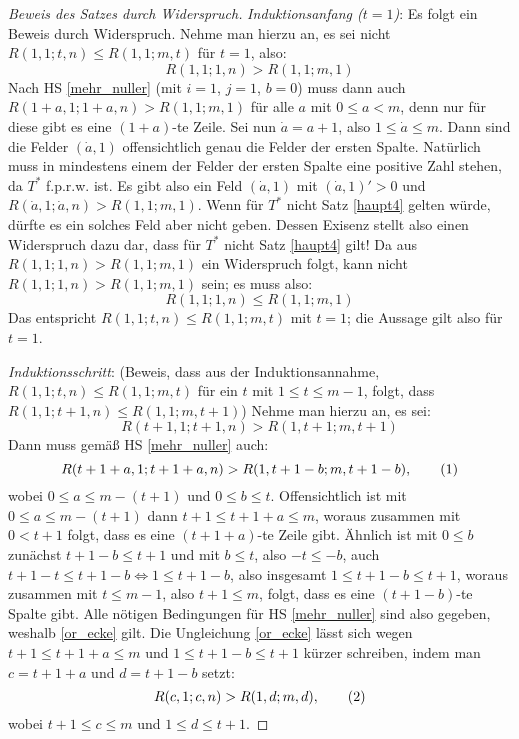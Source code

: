 \begin{proof}[Beweis des Satzes durch Widerspruch]
    \textit{Induktionsanfang ($t=1$)}: Es folgt ein Beweis durch Widerspruch. Nehme man hierzu an, es sei nicht 
    $R(1, 1; t, n)\leq R(1, 1; m, t)$ für $t=1$, also:
    \[
        R(1, 1; 1, n)>R(1, 1; m, 1)
    \]
    Nach HS \ref{mehr_nuller} (mit $i=1$, $j=1$, $b=0$) muss dann auch $R(1+a, 1; 1+a, n) > R(1, 1; m, 1)$ für alle 
    $a$ mit $0\leq a<m$, denn nur für diese gibt es eine $(1+a)$-te Zeile. Sei nun $\dot a=a+1$, also $1\leq \dot 
    a\leq m$. Dann sind die Felder $(\dot a, 1)$ offensichtlich genau die Felder der ersten Spalte. Natürlich muss 
    in mindestens einem der Felder der ersten Spalte eine positive Zahl stehen, da $T^*$ f.p.r.w. ist. Es gibt also 
    ein Feld $(\dot a, 1)$ mit $(\dot a, 1)'>0$ und $R(\dot a, 1; \dot a, n)>R(1, 1; m, 1)$. Wenn für $T^*$ nicht 
    Satz \ref{haupt4} gelten würde, dürfte es ein solches Feld aber nicht geben. Dessen Exisenz stellt also einen 
    Widerspruch dazu dar, dass für $T^*$ nicht Satz \ref{haupt4} gilt! Da aus $R(1, 1; 1, n)>R(1, 1; m, 1)$ ein 
    Widerspruch folgt, kann nicht $R(1, 1; 1, n)>R(1, 1; m, 1)$ sein; es muss also:
    \[
        R(1, 1; 1, n)\leq R(1, 1; m, 1)
    \]
    Das entspricht $R(1, 1; t, n)\leq R(1, 1; m, t)$ mit $t=1$; die Aussage gilt also für $t=1$.

    \textit{Induktionsschritt}: (Beweis, dass aus der Induktionsannahme, $R(1, 1; t, n)\leq R(1, 1; m, t)$ für 
    ein $t$ mit $1\leq t\leq m-1$, folgt, dass $R(1, 1; t+1, n)\leq R(1, 1; m, t+1)$) Nehme man hierzu an, es sei:
    \[
        R(t+1, 1; t+1, n)>R(1, t+1; m, t+1)
    \]
    Dann muss gemäß HS \ref{mehr_nuller} auch:
    \[
        R(t+1+a, 1; t+1+a, n)>R(1, t+1-b; m, t+1-b), \numberthis \label{or_ecke}
    \]
    wobei $0\leq a\leq m-(t+1)$ und $0\leq b\leq t$. Offensichtlich ist mit $0\leq a\leq m-(t+1)$ dann $t+1\leq t+1+a
    \leq m$, woraus zusammen mit $0<t+1$ folgt, dass es eine $(t+1+a)$-te Zeile gibt. Ähnlich ist mit $0\leq b$ 
    zunächst $t+1-b\leq t+1$ und mit $b\leq t$, also $-t\leq-b$, auch $t+1-t\leq t+1-b\Leftrightarrow 1\leq t+1-b$, 
    also insgesamt $1\leq t+1-b\leq t+1$, woraus zusammen mit $t\leq m-1$, also $t+1\leq m$, folgt, dass es eine 
    $(t+1-b)$-te Spalte gibt. Alle nötigen Bedingungen für HS \ref{mehr_nuller} sind also gegeben, weshalb 
    \eqref{or_ecke} gilt. Die Ungleichung \eqref{or_ecke} lässt sich wegen $t+1\leq t+1+a\leq m$ und $1\leq t+1-b
    \leq t+1$ kürzer schreiben, indem man $c=t+1+a$ und $d=t+1-b$ setzt:
    \[
        R(c, 1; c, n)>R(1, d; m, d), \numberthis \label{or_eck}
    \]
    wobei $t+1\leq c\leq m$ und $1\leq d\leq t+1$.


\end{proof}
